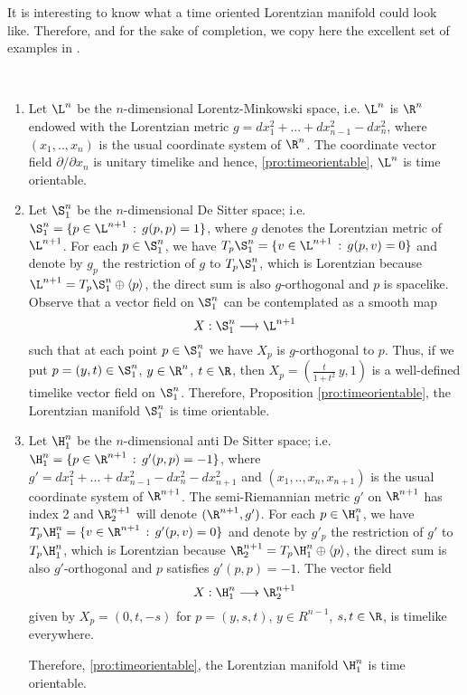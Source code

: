 It is interesting to know what a time oriented Lorentzian manifold could look like. Therefore, and for the sake of completion, we copy here the excellent set of examples in \cite[Example 3.2]{romero10}.

\begin{example}
	~		
	\begin{enumerate}
		\item Let $\L^n$ be the $n$-dimensional Lorentz-Minkowski space, i.e. $\L^n$ is $\R^n$ endowed with the Lorentzian metric $g=dx_1^2+...+dx_{n-1}^2-dx_n^2$, where $(x_1,..,x_n)$ is the usual coordinate system of $\R^n$. The coordinate vector field $\partial/\partial x_n$ is unitary timelike and hence, \autoref{pro:timeorientable}, $\L ^n$ is time orientable.
		\item Let $\S_1^n$ be the $n$-dimensional De Sitter space; i.e. $\S_1^n =\{p \in \L^{n+1} \, :\, g(p,p)=1 \}$, where $g$ denotes the Lorentzian metric of $\L^{n+1}$. For each $p \in \S_1^n$, we have $T_p\S_1^n=\{v \in \L^{n+1} \, : \, g(p,v)=0\}$
		and denote by $g_p$ the restriction of $g$ to $T_p\S_1^n$, which is Lorentzian because $\L^{n+1}=T_p\S_1^n \oplus \langle p \rangle$, the direct sum is also $g$-orthogonal and $p$ is spacelike. Observe that a vector field on $\S_1^n$ can be contemplated as a smooth map
		\[
		X : \S_1^n \longrightarrow \L^{n+1}
		\]
		such that at each point $p \in \S_1^n$ we have $X_p$ is $g$-orthogonal to $p$. Thus, if we put $p=(y,t)\in \S_1^n$, $y \in \R^n$, $t \in \R$, then $X_p=(\frac{t}{1+t^2}\,y,1)$ is a well-defined timelike vector field on $\S_1^n$. Therefore, Proposition \autoref{pro:timeorientable}, the Lorentzian manifold $\S_1^n$ is time orientable.
		\item Let $\H_1^n$ be the $n$-dimensional anti De Sitter space; i.e. $\H_1^n =\{p \in \R^{n+1} \, :\, g'(p,p)=-1 \}$, where $g'=dx_1^2+...+dx_{n-1}^2-dx_n^2-dx_{n+1}^2$ and $(x_1,..,x_n,x_{n+1})$ is the usual coordinate system of $\R^{n+1}$. The semi-Riemannian metric $g'$ on $\R^{n+1}$ has index 2 and $\R^{n+1}_2$ will denote $(\R^{n+1},g')$. For each $p \in \H_1^n$, we have $T_p\H_1^n=\{v \in \R^{n+1} \, : \, g'(p,v)=0\}$ and denote by $g'_p$ the restriction of $g'$ to $T_p\H_1^n$, which is Lorentzian because $\R^{n+1}_2=T_p\H_1^n \oplus \langle p \rangle$, the direct sum is also $g'$-orthogonal and $p$ satisfies $g'(p,p)=-1$. The vector field
		\[
		X : \H_1^n \longrightarrow \R^{n+1}_2
		\]
		given by $X_p=(0,t,-s)$ for $p=(y,s,t)$, $y \in R^{n-1}$, $s,t\in \R$, is timelike everywhere.
		
		Therefore, \autoref{pro:timeorientable}, the Lorentzian manifold $\H_1^n$ is time orientable.
	\end{enumerate}
\end{example}

